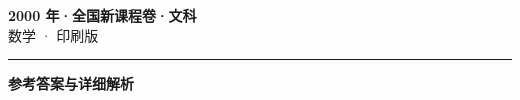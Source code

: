 \documentclass[zihao=5, a4paper]{ctexart}
\begin{document}
\begin{center}
  {\Large\bfseries 2000 年·全国新课程卷·文科}\\[4pt]
  {\large 数学 · 印刷版}
\end{center}
\medskip
{}

\par\bigskip\hrule\bigskip
{}
\begin{center}{\large\bfseries 参考答案与详细解析}\end{center}
\smallskip

\end{document}
